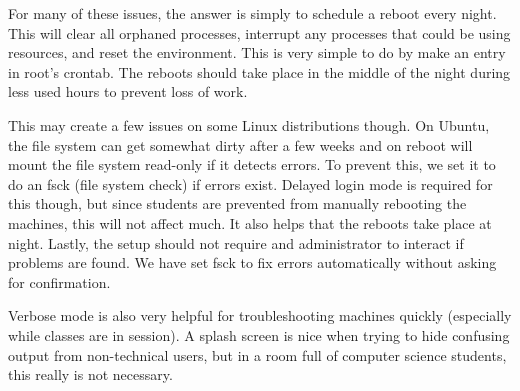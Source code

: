 For many of these issues, the answer is simply to schedule a reboot every night.  This will clear all orphaned processes, interrupt any processes that could be using resources, and reset the environment.  This is very simple to do by make an entry in root's crontab.  The reboots should take place in the middle of the night during less used hours to prevent loss of work.  

This may create a few issues on some Linux distributions though.  On Ubuntu, the file system can get somewhat dirty after a few weeks and on reboot will mount the file system read-only if it detects errors.  To prevent this, we set it to do an fsck (file system check) if errors exist.  Delayed login mode is required for this though, but since students are prevented from manually rebooting the machines, this will not affect much.  It also helps that the reboots take place at night.  Lastly, the setup should not require and administrator to interact if problems are found.  We have set fsck to fix errors automatically without asking for confirmation.  

Verbose mode is also very helpful for troubleshooting machines quickly (especially while classes are in session).  A splash screen is nice when trying to hide confusing output from non-technical users, but in a room full of computer science students, this really is not necessary.  


